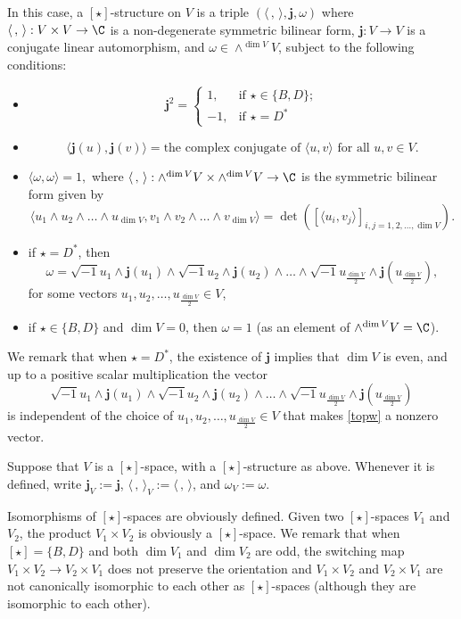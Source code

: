 \documentclass[12pt,a4paper]{amsart}
\newcommand{\la}{\langle}
\newcommand{\ra}{\rangle}
\newcommand{\be}{\begin {equation}}
\newcommand{\ee}{\end {equation}}
\numberwithin{equation}{section}
\theoremstyle{remark}
\begin{document}
 In this case, a $[\star]$-structure on $V$ is a triple $(\la\,,\,\ra, \mathbf j, \omega)$ where
 $ \la\,,\,\ra: V\times V\rightarrow \C $ is a non-degenerate symmetric bilinear form,  $\mathbf j: V\rightarrow V$ is a conjugate linear automorphism, and $\omega\in \wedge^{\dim V} V$, subject to the following conditions:
 \begin{itemize}
 \item
 \[
  \mathbf j^2= \begin{cases}
  1,  &  \text{if $\star\in\{B,D\}$};\\
  -1,    &  \text{if $\star=D^*$}
    \end{cases}
\]
\item
 \[
   \la \mathbf j(u), \mathbf j(v)\ra =\textrm{the complex conjugate of  $\la u, v\ra$ for all $u,v\in V$}.
 \]
 \item
$
 \la \omega, \omega\ra=1,$
where $\la\,,\,\ra: \wedge^{\dim V} V\times \wedge^{\dim V} V\rightarrow \C$ is the symmetric bilinear form given by
\be\label{laraw}
  \la u_1\wedge u_2\wedge \dots \wedge u_{\dim V}, v_1\wedge v_2\wedge \dots \wedge v_{\dim V} \ra=\det \left( [\la u_i, v_j \ra]_{i,j=1,2, \dots, \dim V}\right).
\ee
 \item
if $\star=D^*$, then
\be\label{dstaro}
 \omega=\sqrt{-1} u_1\wedge \mathbf j(u_1)\wedge \sqrt{-1} u_2\wedge \mathbf j(u_2)\wedge \dots \wedge \sqrt{-1} u_{\frac{\dim V}{2}} \wedge \mathbf j(u_{\frac{\dim V}{2}}),
 \ee
 for some  vectors $u_1, u_2, \dots, u_{\frac{\dim V}{2}}\in V$,
 \item
if $\star\in \{B,D\}$ and $\dim V=0$, then $\omega=1$ (as an element of $\wedge^{\dim V} V=\C$).
 \end{itemize}

We remark that when  $\star=D^*$,  the existence of $\mathbf j$ implies that $\dim V$ is even, and up to a positive scalar multiplication
the vector
 \be\label{topw}
 \sqrt{-1} u_1\wedge \mathbf j(u_1)\wedge \sqrt{-1} u_2\wedge \mathbf j(u_2)\wedge \dots \wedge \sqrt{-1} u_{\frac{\dim V}{2}} \wedge \mathbf j(u_{\frac{\dim V}{2}})
 \ee
 is independent of the choice of  $u_1, u_2, \dots, u_{\frac{\dim V}{2}}\in V$ that makes \eqref{topw} a nonzero vector.


Suppose that $V$ is a $[\star]$-space, with a $[\star]$-structure as above. Whenever it is defined, write $\mathbf j_V:=\mathbf j$, $\la\,,\,\ra_V:=\la\,,\,\ra$, and $\omega_V:=\omega$.

Isomorphisms of $[\star]$-spaces are obviously defined. Given two $[\star]$-spaces $V_1$ and $V_2$, the product $V_1\times V_2$ is obviously a $[\star]$-space. We remark that when $[\star]=\{B,D\}$ and both $\dim V_1$ and $\dim V_2$ are odd, the switching map $V_1\times V_2\rightarrow V_2\times V_1$ does not preserve the orientation and  $V_1\times V_2$ and $V_2\times V_1$ are not canonically isomorphic to each other as $[\star]$-spaces (although they are isomorphic to each other).
\end{document}
